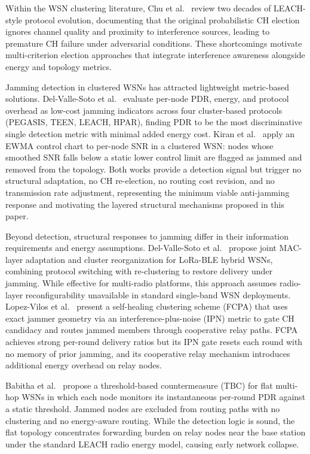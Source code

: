 \documentclass[conference]{IEEEtran}
\begin{document}
Within the WSN clustering literature, Chu et al.~\cite{Chu2026} review
two decades of LEACH-style protocol evolution, documenting that the
original probabilistic CH election ignores channel quality and proximity
to interference sources, leading to premature CH failure under
adversarial conditions. These shortcomings motivate multi-criterion
election approaches that integrate interference awareness alongside
energy and topology metrics.

Jamming detection in clustered WSNs has attracted lightweight
metric-based solutions. Del-Valle-Soto et al.~\cite{DelValleSoto2021}
evaluate per-node PDR, energy, and protocol overhead as low-cost
jamming indicators across four cluster-based protocols (PEGASIS, TEEN,
LEACH, HPAR), finding PDR to be the most discriminative single
detection metric with minimal added energy cost. Kiran
et al.~\cite{9915936} apply an EWMA control chart to per-node SNR in a
clustered WSN: nodes whose smoothed SNR falls below a static lower
control limit are flagged as jammed and removed from the topology. Both
works provide a detection signal but trigger no structural
adaptation, no CH re-election, no routing cost revision, and no
transmission rate adjustment, representing the minimum viable
anti-jamming response and motivating the layered structural mechanisms
proposed in this paper.

Beyond detection, structural responses to jamming differ in their
information requirements and energy assumptions.
Del-Valle-Soto et al.~\cite{DelValleSoto2025} propose joint
MAC-layer adaptation and cluster reorganization for LoRa-BLE hybrid
WSNs, combining protocol switching with re-clustering to restore
delivery under jamming. While effective for multi-radio platforms, this
approach assumes radio-layer reconfigurability unavailable in standard
single-band WSN deployments. Lopez-Vilos et al.~\cite{s23156894}
present a self-healing clustering scheme (FCPA) that uses exact jammer
geometry via an interference-plus-noise (IPN) metric to gate CH
candidacy and routes jammed members through cooperative relay paths.
FCPA achieves strong per-round delivery ratios but its IPN gate resets
each round with no memory of prior jamming, and its cooperative relay
mechanism introduces additional energy overhead on relay nodes.

Babitha et al.~\cite{11156845} propose a threshold-based countermeasure
(TBC) for flat multi-hop WSNs in which each node monitors its
instantaneous per-round PDR against a static threshold. Jammed nodes
are excluded from routing paths with no clustering and no energy-aware
routing. While the detection logic is sound, the flat topology
concentrates forwarding burden on relay nodes near the base station
under the standard LEACH radio energy model, causing early network
collapse.
\end{document}
